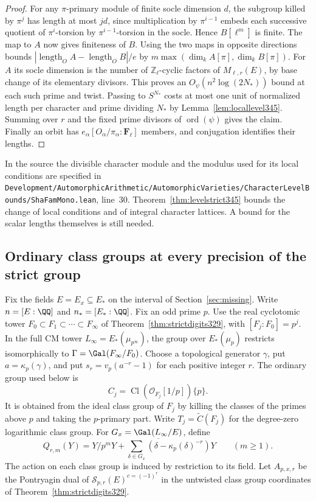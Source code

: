 \documentclass[a4paper,11pt]{article}
\theoremstyle{definition}
\theoremstyle{remark}
\newcommand{\ZZ}{\mathbb Z}\newcommand{\ord}{\operatorname{ord}}
\newcommand{\len}{\operatorname{length}}\newcommand{\Res}{\operatorname*{Res}}
\newcommand{\srcloc}[2]{{\small\nolinkurl{#1.lean}}, line~#2}
\numberwithin{equation}{section}
\newcommand{\Cl}{\operatorname{Cl}}
\begin{document}
\begin{proof}
For any $\pi$-primary module of finite socle dimension $d$, the
subgroup killed by $\pi^j$ has length at most $jd$, since multiplication
by $\pi^{i-1}$ embeds each successive quotient of $\pi^i$-torsion
by $\pi^{i-1}$-torsion in the socle. Hence $B[\ell^m]$ is finite.
The map to $A$ now gives finiteness of $B$. Using the two maps in
opposite directions bounds $\left|\len_O A-\len_O B\right|/e$
by $m\max(\dim_k A[\pi],\dim_k B[\pi])$. For $A$ its socle
dimension is the number of $\ZZ_\ell$-cyclic factors of
$M_{\ell,r}(E)$, by base change of its elementary divisors.
This proves an $O_\psi(n^2\log(2N_*))$ bound at each such prime
and twist. Passing to $S^{N_*}$ costs at most one unit of normalized
length per character and prime dividing $N_*$ by
Lemma~\ref{lem:locallevel345}. Summing over $r$ and the fixed
prime divisors of $\operatorname{ord}(\psi)$ gives the claim.
Finally an orbit has $e_\alpha[O_\alpha/\pi_\alpha:\mathbf F_\ell]$
members, and conjugation identifies their lengths.
\end{proof}

In the source the divisible character module and the modulus used for
its local conditions are specified in
\srcloc{Development/AutomorphicArithmetic/AutomorphicVarieties/CharacterLevelBounds/ShaFamMono}{30}.
Theorem~\ref{thm:levelstrict345} bounds the change of local conditions
and of integral character lattices. A bound for the scalar lengths
themselves is still needed.



\subsection{Ordinary class groups at every precision of the strict group}
\label{sec:ordinarydigits514}

Fix the fields \(E=E_x\subseteq E_*\) on the interval of
Section~\ref{sec:missing}. Write \(n=[E:\QQ]\) and \(n_*=[E_*:\QQ]\).
Fix an odd prime \(p\). Use the real cyclotomic tower
\(F_0\subset F_1\subset\cdots\subset F_\infty\) of
Theorem~\ref{thm:strictdigits329}, with \([F_j:F_0]=p^j\).
In the full CM tower \(L_\infty=E_*(\mu_{p^\infty})\), the group
over \(E_*(\mu_p)\) restricts isomorphically to
\(\Gamma=\Gal(F_\infty/F_0)\). Choose a topological generator
\(\gamma\), put \(a=\kappa_p(\gamma)\), and put
\(s_r=v_p(a^{-r}-1)\) for each positive integer \(r\).
The ordinary group used below is
\[
 C_j=\Cl(\mathcal O_{F_j}[1/p])\{p\}.
\]
It is obtained from the ideal class group of \(F_j\) by killing
the classes of the primes above \(p\) and taking the \(p\)-primary
part. Write \(T_j=\widetilde C(F_j)\) for the degree-zero
logarithmic class group. For \(G_x=\Gal(L_\infty/E)\), define
\[
 Q_{r,m}(Y)=Y\Big/\overline{p^mY+
         \sum_{\delta\in G_x}(\delta-\kappa_p(\delta)^{-r})Y}
         \qquad(m\ge1).
\]
The action on each class group is induced by restriction to
its field. Let \(A_{p,x,r}\) be the Pontryagin dual of
\(\mathcal S_{p,r}(E)^{c=(-1)^r}\) in the untwisted class
group coordinates of Theorem~\ref{thm:strictdigits329}.
\end{document}
